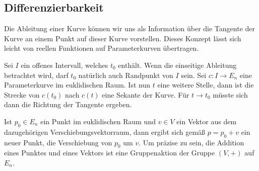\subsection{Differenzierbarkeit}
Die Ableitung einer Kurve können wir uns als Information über die
Tangente der Kurve an einem Punkt auf dieser Kurve vorstellen. Dieses
Konzept lässt sich leicht von reellen Funktionen auf Parameterkurven
übertragen.

Sei $I$ ein offenes Intervall, welches $t_0$ enthält. Wenn die einseitige
Ableitung betrachtet wird, darf $t_0$ natürlich auch Randpunkt von $I$
sein. Sei $c\colon I\to E_n$ eine Parameterkurve im euklidischen
Raum. Ist nun $t$ eine weitere Stelle, dann ist die Strecke von
$c(t_0)$ nach $c(t)$ eine Sekante der Kurve. Für $t\to t_0$
müsste sich dann die Richtung der Tangente ergeben.

Ist $p_0\in E_n$ ein Punkt im euklidischen Raum und $v\in V$ ein Vektor
aus dem dazugehörigen Verschiebungsvektorraum, dann ergibt sich
gemäß $p=p_0+v$ ein neuer Punkt, die Verschiebung von $p_0$ um $v$.
Um präzise zu sein, die Addition eines Punktes und eines Vektors ist
eine Gruppenaktion der Gruppe $(V,+)$ auf $E_n$. 

